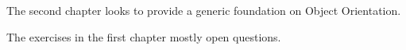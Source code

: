 
The second chapter looks to provide a generic foundation on Object Orientation.  

\label{ssec:Exercises}

The exercises in the first chapter mostly open questions.
\pagebreak